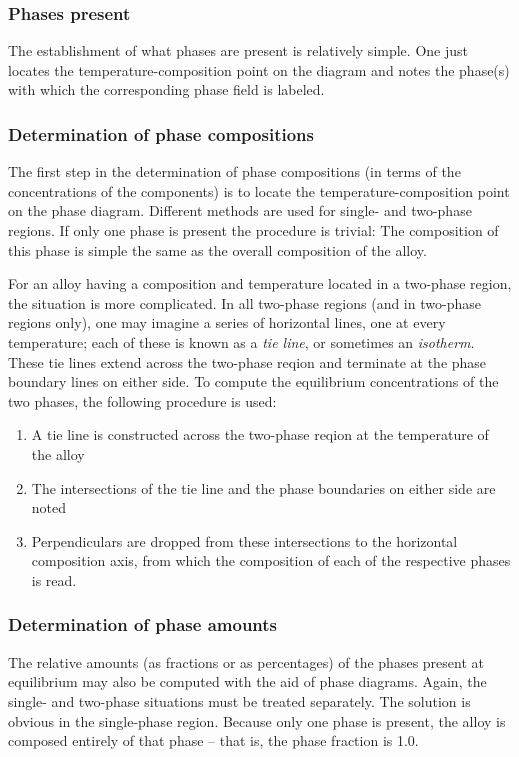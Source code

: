 \subsubsection{Phases present}
The establishment of what phases are present is relatively simple. One just locates the temperature-composition point on the diagram and notes the phase(s) with which the corresponding phase field is labeled.

\subsubsection{Determination of phase compositions}
The first step in the determination of phase compositions (in terms of the concentrations of the components) is to locate the temperature-composition point on the phase diagram. Different methods are used for single- and two-phase regions. If only one phase is present the procedure is trivial: The composition of this phase is simple the same as the overall composition of the alloy.

For an alloy having a composition and temperature located in a two-phase region, the situation is more complicated. In all two-phase regions (and in two-phase regions only), one may imagine a series of horizontal lines, one at every temperature; each of these is known as a \textit{tie line}, or sometimes an \textit{isotherm}. These tie lines extend across the two-phase reqion and terminate at the phase boundary lines on either side. To compute the equilibrium concentrations of the two phases, the following procedure is used:
\begin{enumerate}
  \item A tie line is constructed across the two-phase reqion at the temperature of the alloy
  \item The intersections of the tie line and the phase boundaries on either side are noted
  \item Perpendiculars are dropped from these intersections to the horizontal composition axis, from which the composition of each of the respective phases is read. 
\end{enumerate}


\subsubsection{Determination of phase amounts}
The relative amounts (as fractions or as percentages) of the phases present at equilibrium may also be computed with the aid of phase diagrams. Again, the single- and two-phase situations must be treated separately. The solution is obvious in the single-phase region. Because only one phase is present, the alloy is composed entirely of that phase -- that is, the phase fraction is \num{1,0}.

